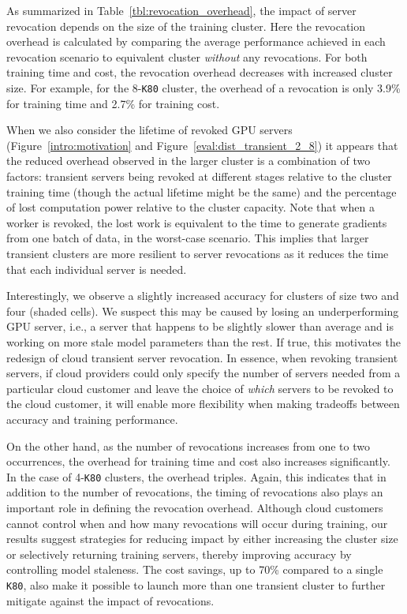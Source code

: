 As summarized in Table~\ref{tbl:revocation_overhead}, the impact of server
revocation depends on the size of the training cluster. Here the revocation
overhead is calculated by comparing the average performance achieved in each
revocation scenario to equivalent cluster \emph{without} any revocations.  For both
training time and cost, the revocation overhead decreases with increased
cluster size. For example, for the 8-\texttt{K80} cluster, the overhead of a
revocation is only 3.9\% for training time and 2.7\% for training cost. 

When we also consider the lifetime of revoked GPU servers (Figure~\ref{intro:motivation} and 
Figure~\ref{eval:dist_transient_2_8}) it appears that the reduced overhead observed in the
larger cluster is a combination of two factors: transient servers being revoked at different
stages relative to the cluster training time (though the actual lifetime might
be the same) and the percentage of lost computation power relative to the
cluster capacity. Note that when a worker is revoked, the lost work is equivalent to the 
time to generate gradients from one batch of data, in the worst-case scenario.
This implies that larger transient clusters 
are more resilient to server revocations as it reduces the time that each
individual server is needed. 

Interestingly, we  observe a slightly increased accuracy for clusters of size
two and four (shaded cells).  We suspect this may be caused by losing an
underperforming GPU
server, i.e., a server that happens to be slightly slower than average and is working on more
stale model parameters than the rest. If true, this motivates the redesign of
cloud transient server revocation. In essence, when revoking transient servers,
if cloud providers could only specify the number of servers needed from a
particular cloud customer and leave the choice of \emph{which} servers to be revoked
to the cloud customer, it will enable more flexibility when making tradeoffs
between accuracy and training performance. 

On the other hand, as the number of revocations increases from one to two
occurrences, the overhead for training time and cost also increases
significantly. In the case of  4-\texttt{K80} clusters, the overhead triples.
Again, this indicates that in addition to the number of revocations, the timing
of revocations also plays an important role in defining the revocation
overhead. Although cloud customers cannot control when and how many revocations
will occur during training, our results suggest strategies for reducing  impact
by either increasing the cluster size or selectively returning training
servers,
thereby improving accuracy by controlling model staleness. The cost savings, up
to 70\% compared to a single \texttt{K80}, also make it possible to launch more
than one transient cluster to further mitigate against the impact of
revocations. 


